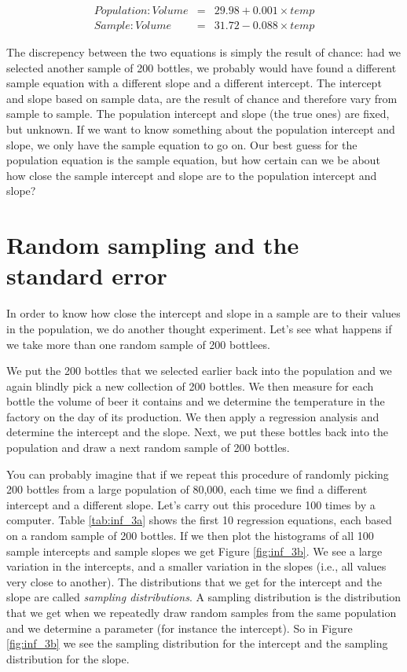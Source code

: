 \documentclass[]{book}\usepackage[]{graphicx}\usepackage[]{color}
\begin{document}
\begin{eqnarray}
Population: Volume &=& 29.98 + 0.001 \times temp  \nonumber\\
Sample: Volume &=&  31.72  -0.088 \times temp \nonumber
\end{eqnarray}

The discrepency between the two equations is simply the result of chance: had we selected another sample of 200 bottles, we probably would have found a different sample equation with a different slope and a different intercept. The intercept and slope based on sample data, are the result of chance and therefore vary from sample to sample. The population intercept and slope (the true ones) are fixed, but unknown. If we want to know something about the population intercept and slope, we only have the sample equation to go on. Our best guess for the population equation is the sample equation, but how certain can we be about how close the sample intercept and slope are to the population intercept and slope?


\section{Random sampling and the standard error}


In order to know how close the intercept and slope in a sample are to their values in the population, we do another thought experiment. Let's see what happens if we take more than one random sample of 200 bottlees. 

We put the 200 bottles that we selected earlier back into the population and we again blindly pick a new collection of 200 bottles. We then measure for each bottle the volume of beer it contains and we determine the temperature in the factory on the day of its production. We then apply a regression analysis and determine the intercept and the slope. Next, we put these bottles back into the population and draw a next random sample of 200 bottles.

You can probably imagine that if we repeat this procedure of randomly picking 200 bottles from a large population of 80,000, each time we find a different intercept and a different slope. Let's carry out this procedure 100 times by a computer. Table \ref{tab:inf_3a} shows the first 10 regression equations, each based on a random sample of 200 bottles. If we then plot the histograms of all 100 sample intercepts and sample slopes we get Figure \ref{fig:inf_3b}. We see a large variation in the intercepts, and a smaller variation in the slopes (i.e., all values very close to another). The distributions that we get for the intercept and the slope are called \textit{sampling distributions}. A sampling distribution is the distribution that we get when we repeatedly draw random samples from the same population and we determine a parameter (for instance the intercept). So in Figure \ref{fig:inf_3b} we see the sampling distribution for the intercept and the sampling distribution for the slope. 
\end{document}
